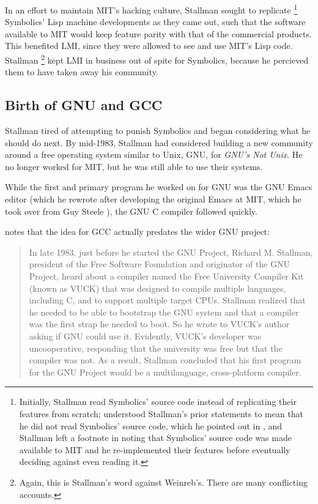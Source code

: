 In an effort to maintain MIT's hacking culture, Stallman sought to replicate
\footnote{Initially, Stallman read Symbolics' source code instead of
	replicating their features from scratch;
	\citeauthor{weinreb_symbolics_history_2020} understood Stallman's prior
	statements to mean that he did not read Symbolics' source code,
	which he pointed out in \parencite{weinreb_symbolics_history_2020},
	and Stallman left a footnote in
	\parencite[footnote 7]{stallman_my_lisp_experiences_2002}
	noting that Symbolics' source code was made available to MIT and he re-implemented
	their features before eventually deciding against even reading it.}
Symbolics' Lisp machine developments as they came out, such that the software
available to MIT would keep feature parity with that of the commercial products.
This benefited LMI, since they were allowed to see and use MIT's Lisp code.
Stallman \footnote{Again, this is Stallman's word against Weinreb's.
	There are many conflicting accounts.} kept LMI in business out of spite
for Symbolics, because he percieved them to have taken away his community.

\subsection{Birth of GNU and GCC}

Stallman tired of attempting to punish Symbolics and began considering
what he should do next.
By mid-1983, Stallman had considered building a new community around
a free operating system similar to Unix, GNU, for \textit{GNU's Not Unix}.
He no longer worked for MIT, but he was still able to use their systems.

While the first and primary program he worked on for GNU
was the GNU Emacs editor (which he rewrote after developing the original Emacs
at MIT, which he took over from Guy Steele
\parencite[footnote 1]{stallman_my_lisp_experiences_2002}),
the GNU C compiler followed quickly.

\citeauthor{von_hagen_definitive_guide_gcc_2011} notes that the idea for GCC
actually predates the wider GNU project:

\begin{quotation}
	In late 1983, just before he started
	the GNU Project, Richard M. Stallman, president of the Free Software Foundation and originator of the
	GNU Project, heard about a compiler named the Free University Compiler Kit (known as VUCK) that
	was designed to compile multiple languages, including C, and to support multiple target CPUs. Stallman
	realized that he needed to be able to bootstrap the GNU system and that a compiler was the first
	strap he needed to boot. So he wrote to VUCK’s author asking if GNU could use it. Evidently, VUCK’s
	developer was uncooperative, responding that the university was free but that the compiler was not.
	As a result, Stallman concluded that his first program for the GNU Project would be a multilanguage,
	cross-platform compiler.
	\parencite{von_hagen_definitive_guide_gcc_2011}
\end{quotation}

